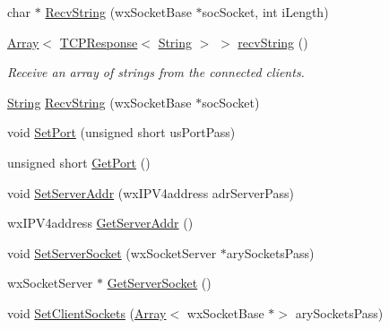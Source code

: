 \begin{DoxyCompactItemize}
char $\ast$ \mbox{\hyperlink{class_rad_j_a_v_1_1_networking_1_1wx_widgets_t_c_p_server_add4a137d2a89f6fb6a64c7b8055f46c2}{Recv\+String}} (wx\+Socket\+Base $\ast$soc\+Socket, int i\+Length)
\item 
\mbox{\hyperlink{class_rad_j_a_v_1_1_array}{Array}}$<$ \mbox{\hyperlink{class_rad_j_a_v_1_1_networking_1_1_t_c_p_response}{T\+C\+P\+Response}}$<$ \mbox{\hyperlink{class_rad_j_a_v_1_1_string}{String}} $>$ $>$ \mbox{\hyperlink{class_rad_j_a_v_1_1_networking_1_1wx_widgets_t_c_p_server_a39b86fd7c19dcc9a7f6edb5844207056}{recv\+String}} ()
\begin{DoxyCompactList}\small\item\em Receive an array of strings from the connected clients. \end{DoxyCompactList}\item 
\mbox{\hyperlink{class_rad_j_a_v_1_1_string}{String}} \mbox{\hyperlink{class_rad_j_a_v_1_1_networking_1_1wx_widgets_t_c_p_server_ae10f57d8657a085aaad9ea967cfcdda3}{Recv\+String}} (wx\+Socket\+Base $\ast$soc\+Socket)
\item 
void \mbox{\hyperlink{class_rad_j_a_v_1_1_networking_1_1wx_widgets_t_c_p_server_a3779c06a1fca6293155a34008ae044d3}{Set\+Port}} (unsigned short us\+Port\+Pass)
\item 
unsigned short \mbox{\hyperlink{class_rad_j_a_v_1_1_networking_1_1wx_widgets_t_c_p_server_a0a8c3796d3ea9536001e993155f9ffca}{Get\+Port}} ()
\item 
void \mbox{\hyperlink{class_rad_j_a_v_1_1_networking_1_1wx_widgets_t_c_p_server_af1f01bbea328dbb2024f49ea0a078300}{Set\+Server\+Addr}} (wx\+I\+P\+V4address adr\+Server\+Pass)
\item 
wx\+I\+P\+V4address \mbox{\hyperlink{class_rad_j_a_v_1_1_networking_1_1wx_widgets_t_c_p_server_a95f0ce3c74eaa8e5482b7a47c3c4afd4}{Get\+Server\+Addr}} ()
\item 
void \mbox{\hyperlink{class_rad_j_a_v_1_1_networking_1_1wx_widgets_t_c_p_server_a3e088be7abe0d7306546bc76f665a24e}{Set\+Server\+Socket}} (wx\+Socket\+Server $\ast$ary\+Sockets\+Pass)
\item 
wx\+Socket\+Server $\ast$ \mbox{\hyperlink{class_rad_j_a_v_1_1_networking_1_1wx_widgets_t_c_p_server_ad4131a0658edc2d70ee89221e6fa417a}{Get\+Server\+Socket}} ()
\item 
void \mbox{\hyperlink{class_rad_j_a_v_1_1_networking_1_1wx_widgets_t_c_p_server_a226d05d1fee31099bb2f9b0581b2f04c}{Set\+Client\+Sockets}} (\mbox{\hyperlink{class_rad_j_a_v_1_1_array}{Array}}$<$ wx\+Socket\+Base $\ast$$>$ ary\+Sockets\+Pass)
$$
\end{DoxyCompactItemize}
